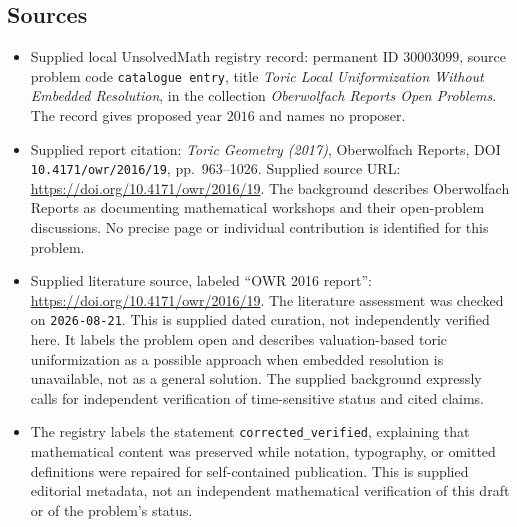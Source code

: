 \documentclass[11pt]{article}
\begin{document}
\subsection{Sources}
\begin{itemize}
\item Supplied local UnsolvedMath registry record: permanent ID \(30003099\), source problem code \texttt{catalogue entry}, title \emph{Toric Local Uniformization Without Embedded Resolution}, in the collection \emph{Oberwolfach Reports Open Problems}. The record gives proposed year \(2016\) and names no proposer.
\item Supplied report citation: \emph{Toric Geometry (2017)}, Oberwolfach Reports, DOI \texttt{10.4171/owr/2016/19}, pp.\ 963--1026. Supplied source URL: \url{https://doi.org/10.4171/owr/2016/19}. The background describes Oberwolfach Reports as documenting mathematical workshops and their open-problem discussions. No precise page or individual contribution is identified for this problem.
\item Supplied literature source, labeled ``OWR 2016 report'': \url{https://doi.org/10.4171/owr/2016/19}. The literature assessment was checked on \texttt{2026-08-21}. This is supplied dated curation, not independently verified here. It labels the problem open and describes valuation-based toric uniformization as a possible approach when embedded resolution is unavailable, not as a general solution. The supplied background expressly calls for independent verification of time-sensitive status and cited claims.
\item The registry labels the statement \texttt{corrected\_verified}, explaining that mathematical content was preserved while notation, typography, or omitted definitions were repaired for self-contained publication. This is supplied editorial metadata, not an independent mathematical verification of this draft or of the problem's status.
\end{itemize}
\end{document}
